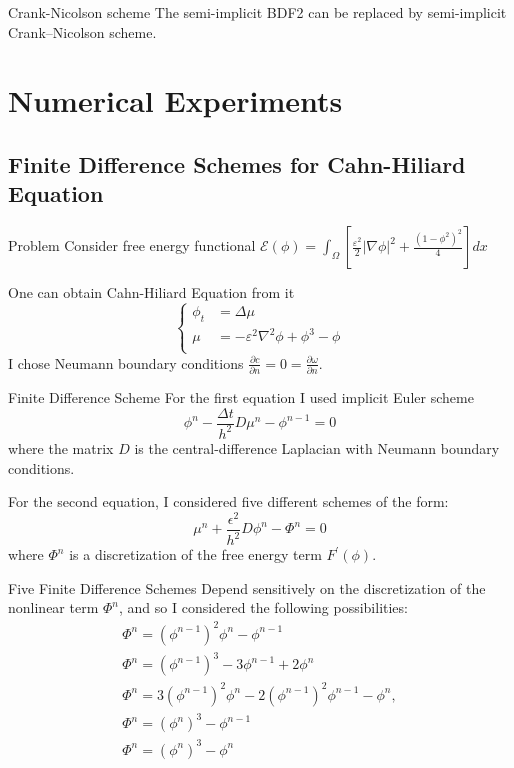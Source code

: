 \documentclass[9pt]{beamer}
\begin{document}
\begin{frame}{Crank-Nicolson scheme}
The semi-implicit BDF2 can be replaced by semi-implicit Crank–Nicolson scheme.
\end{frame}

\section{Numerical Experiments}

\subsection{Finite Difference Schemes for Cahn-Hiliard Equation}
\begin{frame}{Problem}
Consider free energy functional $\mathcal E(\phi) = \int_{\Omega} \left[ \frac{\varepsilon^2}{2}|\nabla \phi|^2 + \frac{(1-\phi^2)^2}{4} \right]dx$

One can obtain Cahn-Hiliard Equation from it
$$\left\{
\begin{aligned}
\phi_t &= \Delta \mu \\
\mu &= -\varepsilon^2\nabla^2\phi +\phi^3 - \phi\\
\end{aligned}
\right.$$
I chose Neumann boundary conditions $\frac{\partial c}{\partial n}=0=\frac{\partial \omega}{\partial n}$.
\end{frame}

\begin{frame}{Finite Difference Scheme}
For the first equation I used implicit Euler scheme
$$\phi^{n}- \frac{\Delta t}{h^2} D \mu^{n}-\phi^{n-1}=0$$
where the matrix $D$ is the central-difference Laplacian with Neumann boundary conditions.

For the second equation, I considered five different schemes of the form:
$$\mu^{n}+\frac{\epsilon^{2}}{h^{2}} D \phi^{n}-\Phi^{n}=0$$
where $\Phi^n$ is a discretization of the free energy term $F^{\prime}(\phi)$.
\end{frame}

\begin{frame}{Five Finite Difference Schemes}
Depend sensitively on the discretization of the nonlinear term $\Phi^n$, and so I considered the following possibilities:
$$
\begin{array}{l}
\Phi^{n}=\left(\phi^{n-1}\right)^{2} \phi^{n}-\phi^{n-1} \\
\Phi^{n}=\left(\phi^{n-1}\right)^{3}-3 \phi^{n-1}+2 \phi^{n} \\
\Phi^{n}=3\left(\phi^{n-1}\right)^{2} \phi^{n}-2\left(\phi^{n-1}\right)^{2} \phi^{n-1}-\phi^{n}, \\
\Phi^{n}=\left(\phi^{n}\right)^{3}-\phi^{n-1} \\
\Phi^{n}=\left(\phi^{n}\right)^{3}-\phi^{n}
\end{array}
$$
\end{frame}
\end{document}
